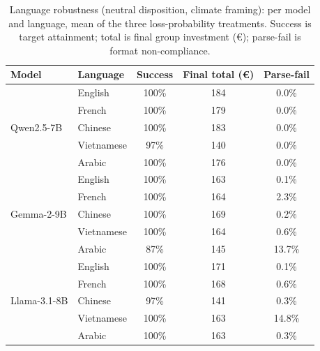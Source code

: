 \begin{table}[t]\centering
\caption{Language robustness (neutral disposition, climate framing): per model and language, mean of the three loss-probability treatments. Success is target attainment; total is final group investment (\euro); parse-fail is format non-compliance.}
\label{tab:si_language}
\begin{tabular}{llccc}\toprule
Model & Language & Success & Final total (\euro) & Parse-fail \\\midrule
\multirow{5}{*}{Qwen2.5-7B} & English & 100\% & 184 & 0.0\% \\
 & French & 100\% & 179 & 0.0\% \\
 & Chinese & 100\% & 183 & 0.0\% \\
 & Vietnamese & 97\% & 140 & 0.0\% \\
 & Arabic & 100\% & 176 & 0.0\% \\
\midrule
\multirow{5}{*}{Gemma-2-9B} & English & 100\% & 163 & 0.1\% \\
 & French & 100\% & 164 & 2.3\% \\
 & Chinese & 100\% & 169 & 0.2\% \\
 & Vietnamese & 100\% & 164 & 0.6\% \\
 & Arabic & 87\% & 145 & 13.7\% \\
\midrule
\multirow{5}{*}{Llama-3.1-8B} & English & 100\% & 171 & 0.1\% \\
 & French & 100\% & 168 & 0.6\% \\
 & Chinese & 97\% & 141 & 0.3\% \\
 & Vietnamese & 100\% & 163 & 14.8\% \\
 & Arabic & 100\% & 163 & 0.3\% \\
\bottomrule\end{tabular}\end{table}

